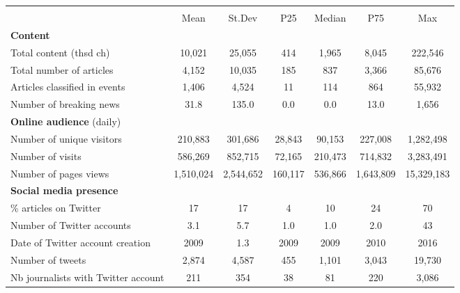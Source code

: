 {
\def\sym#1{\ifmmode^{#1}\else\(^{#1}\)\fi}
\begin{tabular}{l*{1}{cccccc}}
\hline\hline
                    &\multicolumn{6}{c}{}                                                         \\
                    &        Mean&      St.Dev&         P25&      Median&         P75&         Max\\
\hline
\textbf{Content}    &            &            &            &            &            &            \\
Total content (thsd ch)&      10,021&      25,055&         414&       1,965&       8,045&     222,546\\
Total number of articles&       4,152&      10,035&         185&         837&       3,366&      85,676\\
Articles classified in events&       1,406&       4,524&          11&         114&         864&      55,932\\
Number of breaking news&        31.8&       135.0&         0.0&         0.0&        13.0&       1,656\\
\textbf{Online audience} (daily)&            &            &            &            &            &            \\
Number of unique visitors&     210,883&     301,686&      28,843&      90,153&     227,008&   1,282,498\\
Number of visits    &     586,269&     852,715&      72,165&     210,473&     714,832&   3,283,491\\
Number of pages views&   1,510,024&   2,544,652&     160,117&     536,866&   1,643,809&  15,329,183\\
\textbf{Social media presence}&            &            &            &            &            &            \\
\% articles on Twitter&          17&          17&           4&          10&          24&          70\\
Number of Twitter accounts&         3.1&         5.7&         1.0&         1.0&         2.0&          43\\
Date of Twitter account creation&        2009&         1.3&        2009&        2009&        2010&        2016\\
Number of tweets    &       2,874&       4,587&         455&       1,101&       3,043&      19,730\\
Nb journalists with Twitter account&         211&         354&          38&          81&         220&       3,086\\

\end{tabular}}
